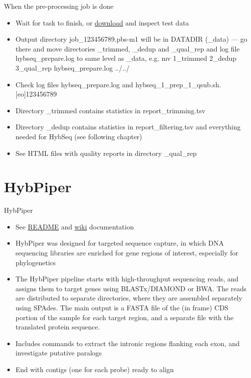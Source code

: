 \documentclass[compress,  xelatex, 11pt, xcolor=x11names, aspectratio=169,
	hyperref={
		bookmarks=true,
		unicode=true,
		colorlinks=true,
		pdftitle={HybSeq course},
		plainpages=false,
		pdfauthor={Vojtech Zeisek},
		pdfsubject={Practical processing of HybSeq target enrichment sequencing data on computing grids like MetaCentrum},
		pdfcreator={XeLaTeX},
		pdfkeywords={BASH, command line, GNU, HybSeq, Linux, MetaCentrum, sequencing shell, target enrichment},
		linkcolor=Turquoise4, %
		anchorcolor=DodgerBlue4, %
		citecolor=DodgerBlue4, %
		filecolor=DodgerBlue4, %
		menucolor=Tan4, %
		urlcolor=DarkOliveGreen4 %
		},
	url={hyphens, lowtilde} %
	]{beamer}
\renewcommand{\texttt}[1]{\colorbox{Cornsilk2}{{\ttfamily #1}}}
\begin{document}
\begin{frame}{When the pre-processing job is done}
	\begin{itemize}
		\item Wait for task to finish, or \href{https://botany.natur.cuni.cz/zeisek/hybseq_course_zingibers_1_prepared.zip}{download} and inspect test data
		\item Output directory \texttt{job\_123456789.pbs-m1} will be in \texttt{DATADIR} (\texttt{0\_data}) --- go there and move directories \texttt{1\_trimmed}, \texttt{2\_dedup} and \texttt{3\_qual\_rep} and log file \texttt{hybseq\_prepare.log} to same level as \texttt{0\_data}, e.g. \texttt{mv 1\_trimmed 2\_dedup 3\_qual\_rep hybseq\_prepare.log ../../}
		\item Check log files \texttt{hybseq\_prepare.log} and \texttt{hybseq\_1\_prep\_1\_qsub.sh.[eo]123456789}
		\item Directory \texttt{1\_trimmed} contains statistics in \texttt{report\_trimming.tsv}
		\item Directory \texttt{2\_dedup} contains statistics in \texttt{report\_filtering.tsv} and everything needed for HybSeq (see following chapter)
		\item See HTML files with quality reports in directory \texttt{3\_qual\_rep}
	\end{itemize}
\end{frame}

\section{HybPiper}

\begin{frame}{HybPiper}
	\begin{itemize}
		\item See \href{https://github.com/mossmatters/HybPiper\#readme}{README} and \href{https://github.com/mossmatters/HybPiper/wiki}{wiki} documentation
		\item HybPiper was designed for targeted sequence capture, in which DNA sequencing libraries are enriched for gene regions of interest, especially for phylogenetics
		\item The HybPiper pipeline starts with high-throughput sequencing reads, and assigns them to target genes using BLASTx/DIAMOND or BWA. The reads are distributed to separate directories, where they are assembled separately using SPAdes. The main output is a FASTA file of the (in frame) CDS portion of the sample for each target region, and a separate file with the translated protein sequence.
		\item Includes commands to extract the intronic regions flanking each exon, and investigate putative paralogs
		\item End with contigs (one for each probe) ready to align
	\end{itemize}
\end{frame}
\end{document}
